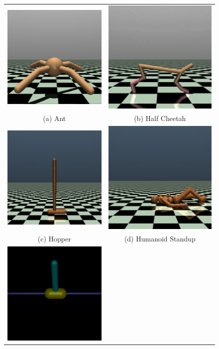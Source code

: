 \documentclass[sigconf]{acmart}
\begin{document}
\begin{figure}[h]
  \centering
  \begin{tabular}{cc}
    \includegraphics[width=0.3\linewidth]{assets/ant} &
    \includegraphics[width=0.3\linewidth]{assets/half_cheetah} \\
    (a) Ant & (b) Half Cheetah \\
    \includegraphics[width=0.3\linewidth]{assets/hopper} &
    \includegraphics[width=0.3\linewidth]{assets/humanoid_standup} \\
    (c) Hopper & (d) Humanoid Standup \\
    \includegraphics[width=0.3\linewidth]{assets/inverted_pendulum} &

\end{tabular}
\end{figure}
\end{document}
